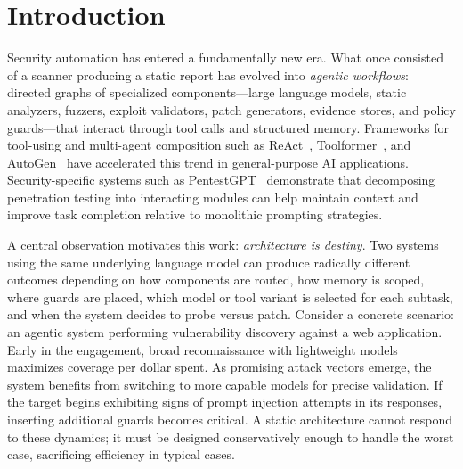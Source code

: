 \documentclass[sigconf,anonymous]{acmart}
\begin{document}


\maketitle

\section{Introduction}
\label{sec:intro}

Security automation has entered a fundamentally new era. What once consisted of a scanner producing a static report has evolved into \emph{agentic workflows}: directed graphs of specialized components---large language models, static analyzers, fuzzers, exploit validators, patch generators, evidence stores, and policy guards---that interact through tool calls and structured memory. Frameworks for tool-using and multi-agent composition such as ReAct~\cite{yao2023react}, Toolformer~\cite{schick2023toolformer}, and AutoGen~\cite{wu2023autogen} have accelerated this trend in general-purpose AI applications. Security-specific systems such as PentestGPT~\cite{deng2024pentestgpt} demonstrate that decomposing penetration testing into interacting modules can help maintain context and improve task completion relative to monolithic prompting strategies.

A central observation motivates this work: \emph{architecture is destiny}. Two systems using the same underlying language model can produce radically different outcomes depending on how components are routed, how memory is scoped, where guards are placed, which model or tool variant is selected for each subtask, and when the system decides to probe versus patch. Consider a concrete scenario: an agentic system performing vulnerability discovery against a web application. Early in the engagement, broad reconnaissance with lightweight models maximizes coverage per dollar spent. As promising attack vectors emerge, the system benefits from switching to more capable models for precise validation. If the target begins exhibiting signs of prompt injection attempts in its responses, inserting additional guards becomes critical. A static architecture cannot respond to these dynamics; it must be designed conservatively enough to handle the worst case, sacrificing efficiency in typical cases.
\end{document}
